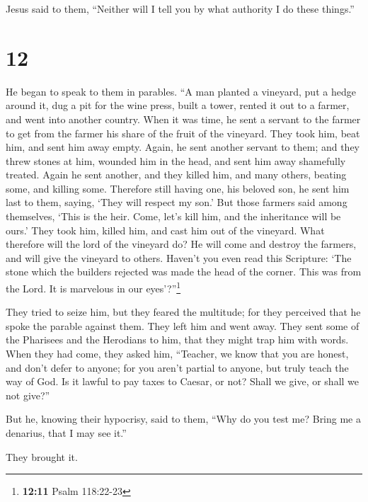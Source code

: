 Jesus said to them, ``Neither will I tell you by what authority I do
these things.''

\hypertarget{section-11}{%
\section{12}\label{section-11}}

 He began to speak to them in parables. ``A man planted a
vineyard, put a hedge around it, dug a pit for the wine press, built a
tower, rented it out to a farmer, and went into another country.
 When it was time, he sent a servant to the farmer to get
from the farmer his share of the fruit of the vineyard. 
They took him, beat him, and sent him away empty.  Again,
he sent another servant to them; and they threw stones at him, wounded
him in the head, and sent him away shamefully treated. 
Again he sent another, and they killed him, and many others, beating
some, and killing some.  Therefore still having one, his
beloved son, he sent him last to them, saying, `They will respect my
son.'  But those farmers said among themselves, `This is
the heir. Come, let's kill him, and the inheritance will be ours.'
 They took him, killed him, and cast him out of the
vineyard.  What therefore will the lord of the vineyard
do? He will come and destroy the farmers, and will give the vineyard to
others.  Haven't you even read this Scripture: `The stone
which the builders rejected was made the head of the corner.
 This was from the Lord. It is marvelous in our
eyes'?''\footnote{\textbf{12:11} Psalm 118:22-23}

 They tried to seize him, but they feared the multitude;
for they perceived that he spoke the parable against them. They left him
and went away.  They sent some of the Pharisees and the
Herodians to him, that they might trap him with words. 
When they had come, they asked him, ``Teacher, we know that you are
honest, and don't defer to anyone; for you aren't partial to anyone, but
truly teach the way of God. Is it lawful to pay taxes to Caesar, or not?
 Shall we give, or shall we not give?''

But he, knowing their hypocrisy, said to them, ``Why do you test me?
Bring me a denarius, that I may see it.''

 They brought it.

